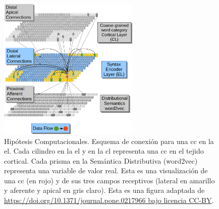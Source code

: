 {\begin{figure}[ht!]
    \centering
    \includegraphics[width=0.6\textwidth]{EncoderConnections.png}
    \caption{Hipótesis Computacionales.
    Esquema de conexión para una \gls{cc} en la \gls{el}.
	    Cada cilindro en la \gls{el} y en la \gls{cl} representa una \gls{cc} en el tejido cortical.
	    Cada prisma en la Semántica Distributiva (word2vec) representa una variable de valor real.
	    Esta es una visualización de una \gls{cc} (en rojo) y de sus tres campos receptivos (lateral en amarillo y aferente y apical en gris claro).
    Esta es una figura adaptada de \url{https://doi.org/10.1371/journal.pone.0217966 bajo licencia CC-BY}.}
    \label{fig:EncoderConnections}
\end{figure}


}

